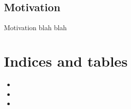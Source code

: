 \documentclass[letterpaper,10pt,english]{sphinxmanual}
\begin{document}
\section{Motivation}
\label{\detokenize{index:motivation}}
Motivation blah blah


\chapter{Indices and tables}
\label{\detokenize{index:indices-and-tables}}\begin{itemize}
\item {} 

\item {} 

\item {} 

\end{itemize}


\renewcommand{\indexname}{Python Module Index}
\begin{sphinxtheindex}
\let\bigletter\sphinxstyleindexlettergroup
\bigletter{n}
\item\relax{}
\item\relax{}
\item\relax{}
\end{sphinxtheindex}

\renewcommand{\indexname}{Index}
\printindex
\end{document}
